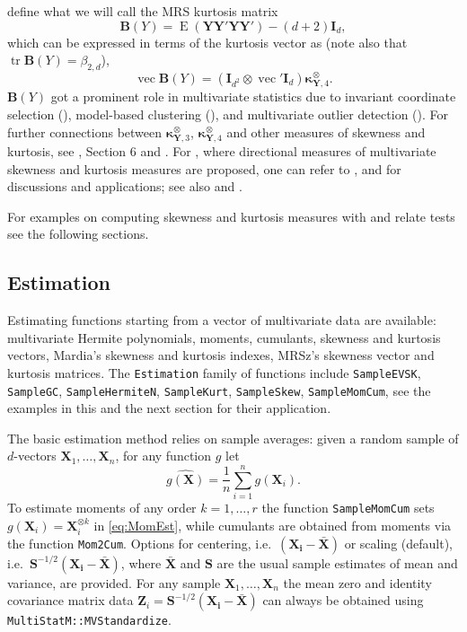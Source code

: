 \citet{mori1994multivariate} define what we will call the MRS kurtosis matrix
\[
\mathbf{B}(Y) =\operatorname{E}\left( \mathbf{Y}\mathbf{Y}' \mathbf{Y}\mathbf{Y}' \right) -(d+2)\mathbf{I}_d,
\]
which can be expressed in terms of the kurtosis vector as (note also that \(\operatorname{tr} \mathbf{B}(Y) = \beta_{2,d}\)),
\[
\operatorname{vec}\mathbf{B}(Y) = \left( \mathbf{I}_{d^2}\otimes \operatorname{vec}' \mathbf{I}_d   \right)\boldsymbol{\kappa}_{\mathbf{Y},4}^\otimes.
\]
\(\mathbf{B}(Y)\) got a prominent role in multivariate statistics due to invariant coordinate selection (\citet{tyler2009}), model-based clustering (\citet{pena2010}), and multivariate outlier detection (\citet{ARCHIMBAUD18}). For further connections between \(\boldsymbol{\kappa}_{\mathbf{Y},3}^\otimes\), \(\boldsymbol{\kappa}_{\mathbf{Y},4}^\otimes\) and other measures of skewness and kurtosis, see \citet{terdik2021multivariate}, Section 6 and \citet{jamma2021San}. For \citet{malkovich1973}, where directional measures of multivariate skewness and kurtosis measures are proposed, one can refer to ,  and \citet{Loperfido15} for discussions and applications; see also \citet{arevalillo20} and \citet{arevalillo21}.

For examples on computing skewness and kurtosis measures with  and relate tests see the following sections.

\hypertarget{estimation}{%
\subsection{Estimation}\label{estimation}}

Estimating functions starting from a vector of multivariate data are available: multivariate Hermite polynomials, moments, cumulants, skewness and kurtosis vectors, Mardia's skewness and kurtosis indexes, MRSz's skewness vector and kurtosis matrices. The \texttt{Estimation} family of functions include \texttt{SampleEVSK}, \texttt{SampleGC}, \texttt{SampleHermiteN}, \texttt{SampleKurt}, \texttt{SampleSkew}, \texttt{SampleMomCum}, see the examples in this and the next section for their application.

The basic estimation method relies on sample averages: given a random sample of \(d\)-vectors \(\mathbf{X}_1, \dots, \mathbf{X}_n\), for any function \(g\) let
\begin{equation}
\widehat{g(\mathbf{X})}= \frac{1}{n}\sum_{i=1}^n g(\mathbf{X}_i).
\label{eq:MomEst}
\end{equation}
To estimate moments of any order \(k=1, \dots, r\) the function \texttt{SampleMomCum} sets \(g(\mathbf{X}_i)=\mathbf{X}_i^{\otimes k}\) in \eqref{eq:MomEst}, while cumulants are obtained from moments via the function \texttt{Mom2Cum}. Options for centering, i.e.~\((\mathbf{X_i}-\bar{\mathbf{X}})\) or scaling (default), i.e.~\(\mathbf{S}^{-1/2}(\mathbf{X_i}-\bar{\mathbf{X}})\), where \(\bar{\mathbf{X}}\) and \(\mathbf{S}\) are the usual sample estimates of mean and variance, are provided. For any sample \(\mathbf{X}_1, \dots, \mathbf{X}_n\) the mean zero and identity covariance matrix data \(\mathbf{Z}_i= \mathbf{S}^{-1/2}(\mathbf{X_i}-\bar{\mathbf{X}})\) can always be obtained using \texttt{MultiStatM::MVStandardize}.

